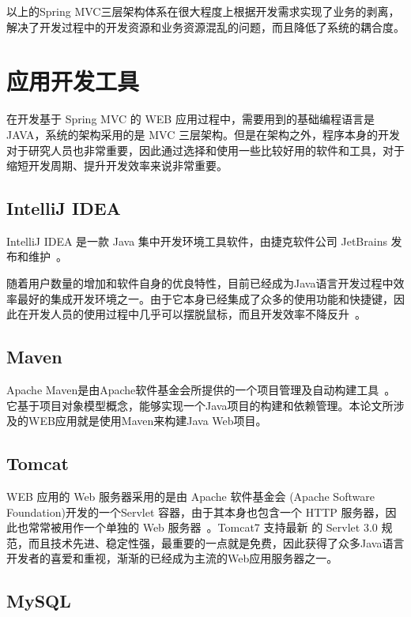 以上的Spring MVC三层架构体系在很大程度上根据开发需求实现了业务的剥离，解决了开发过程中的开发资源和业务资源混乱的问题，而且降低了系统的耦合度。

\section{应用开发工具}

在开发基于 Spring MVC 的 WEB 应用过程中，需要用到的基础编程语言是 JAVA，系统的架构采用的是 MVC 三层架构。但是在架构之外，程序本身的开发对于研究人员也非常重要，因此通过选择和使用一些比较好用的软件和工具，对于缩短开发周期、提升开发效率来说非常重要。

\subsection{IntelliJ IDEA}

IntelliJ IDEA 是一款 Java 集中开发环境工具软件，由捷克软件公司 JetBrains 发布和维护~\cite{jemerov2008implementing}。

随着用户数量的增加和软件自身的优良特性，目前已经成为Java语言开发过程中效率最好的集成开发环境之一。由于它本身已经集成了众多的使用功能和快捷键，因此在开发人员的使用过程中几乎可以摆脱鼠标，而且开发效率不降反升~\cite{IDEA维基百科}。

\subsection{Maven}

Apache Maven是由Apache软件基金会所提供的一个项目管理及自动构建工具~\cite{smart2005introduction}。它基于项目对象模型概念，能够实现一个Java项目的构建和依赖管理。本论文所涉及的WEB应用就是使用Maven来构建Java Web项目。

\subsection{Tomcat}

WEB 应用的 Web 服务器采用的是由 Apache 软件基金会 (Apache Software Foundation)开发的一个Servlet 容器，由于其本身也包含一个 HTTP 服务器，因此也常常被用作一个单独的 Web 服务器~\cite{brittain2007tomcat}。Tomcat7 支持最新 的 Servlet 3.0 规范，而且技术先进、稳定性强，最重要的一点就是免费，因此获得了众多Java语言开发者的喜爱和重视，渐渐的已经成为主流的Web应用服务器之一。

\subsection{MySQL}

